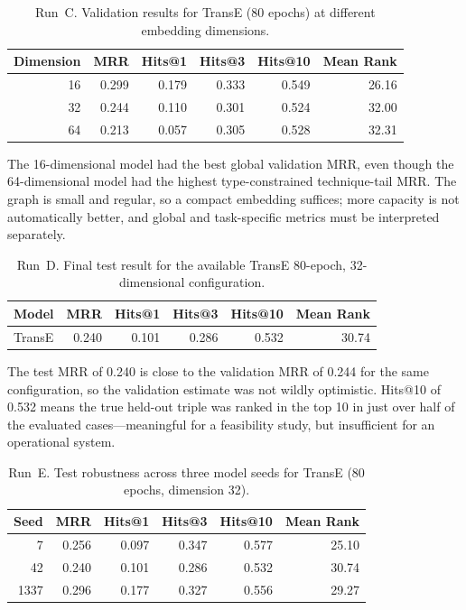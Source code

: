 \documentclass{article}
\begin{document}
\begin{table}[h]
\centering
\begin{tabular}{rrrrrr}
\toprule
\textbf{Dimension} & \textbf{MRR} & \textbf{Hits@1} & \textbf{Hits@3} & \textbf{Hits@10} & \textbf{Mean Rank} \\
\midrule
16 & 0.299 & 0.179 & 0.333 & 0.549 & 26.16 \\
32 & 0.244 & 0.110 & 0.301 & 0.524 & 32.00 \\
64 & 0.213 & 0.057 & 0.305 & 0.528 & 32.31 \\
\bottomrule
\end{tabular}
\caption{Run~C. Validation results for TransE (80 epochs) at different embedding dimensions.}
\end{table}

The 16-dimensional model had the best global validation MRR, even though the
64-dimensional model had the highest type-constrained technique-tail MRR. The
graph is small and regular, so a compact embedding suffices; more capacity is
not automatically better, and global and task-specific metrics must be
interpreted separately.

\begin{table}[h]
\centering
\begin{tabular}{lrrrrr}
\toprule
\textbf{Model} & \textbf{MRR} & \textbf{Hits@1} & \textbf{Hits@3} & \textbf{Hits@10} & \textbf{Mean Rank} \\
\midrule
TransE & 0.240 & 0.101 & 0.286 & 0.532 & 30.74 \\
\bottomrule
\end{tabular}
\caption{Run~D. Final test result for the available TransE 80-epoch, 32-dimensional configuration.}
\end{table}

The test MRR of 0.240 is close to the validation MRR of 0.244 for the same
configuration, so the validation estimate was not wildly optimistic. Hits@10
of 0.532 means the true held-out triple was ranked in the top 10 in just over
half of the evaluated cases---meaningful for a feasibility study, but
insufficient for an operational system.

\begin{table}[h]
\centering
\begin{tabular}{rrrrrr}
\toprule
\textbf{Seed} & \textbf{MRR} & \textbf{Hits@1} & \textbf{Hits@3} & \textbf{Hits@10} & \textbf{Mean Rank} \\
\midrule
7 & 0.256 & 0.097 & 0.347 & 0.577 & 25.10 \\
42 & 0.240 & 0.101 & 0.286 & 0.532 & 30.74 \\
1337 & 0.296 & 0.177 & 0.327 & 0.556 & 29.27 \\
\bottomrule
\end{tabular}
\caption{Run~E. Test robustness across three model seeds for TransE (80 epochs, dimension 32).}
\end{table}
\end{document}
